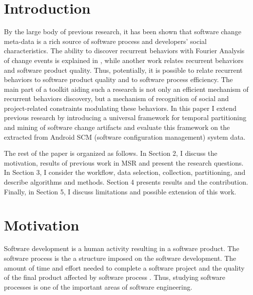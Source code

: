 \documentclass[conference]{worldcomp}
\begin{document}
\section{Introduction}
By the large body of previous research, it has been shown that software change
meta-data is a rich source of software process and developers' social characteristics. 
The ability to discover recurrent behaviors with Fourier Analysis 
of change events is explained in \cite{citeulike:10377345}, while another work
\cite{citeulike:10392277} relates recurrent behaviors and software product quality.
Thus, potentially, it is possible to relate recurrent behaviors to software product 
quality and to software process efficiency. 
The main part of a toolkit aiding such a research is not only an efficient 
mechanism of recurrent behaviors discovery, but a mechanism of recognition of 
social and project-related constraints modulating these behaviors.
In this paper I extend previous research by introducing a universal 
framework for temporal partitioning and mining of software change 
artifacts and evaluate this framework on the extracted from Android 
SCM (software configuration management) system data. 

The rest of the paper is organized as follows. 
In Section 2, I discuss the motivation, results of previous work in MSR and present 
the research questions. 
In Section 3, I consider the workflow, data selection, collection, partitioning, 
and describe algorithms and methods. Section 4 presents results and the contribution.
Finally, in Section 5, I discuss limitations and possible extension of this work.

\section{Motivation}
Software development is a human activity resulting in a software product. The software
process is the a structure imposed on the software development. 
The amount of time and effort needed to complete a software project and the 
quality of the final product affected by software process \cite{citeulike:9919804}.
 Thus, studying software processes is one of 
the important areas of software engineering. 
\end{document}
